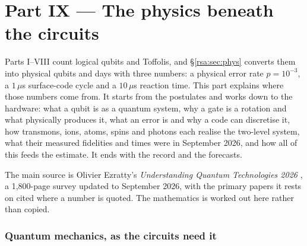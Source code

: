
\part*{Part IX --- The physics beneath the circuits}

\begin{keybox}[title={What this part is for}]
Parts I--VIII count logical qubits and Toffolis, and \S\ref{rsa:sec:phys} converts them into
physical qubits and days with three numbers: a physical error rate $p=10^{-3}$, a $1\,\mu$s
surface-code cycle and a $10\,\mu$s reaction time. This part explains where those numbers come
from. It starts from the postulates and works down to the hardware: what a qubit is as a quantum
system, why a gate is a rotation and what physically produces it, what an error is and why a code
can discretise it, how transmons, ions, atoms, spins and photons each realise the two-level
system, what their measured fidelities and times were in September 2026, and how all of this feeds
the estimate. It ends with the record and the forecasts.

\medskip
The main source is Olivier Ezratty's \emph{Understanding Quantum Technologies 2026}
\cite{ph:uqt26}, a 1,800-page survey updated to September 2026, with the primary papers it rests
on cited where a number is quoted. The mathematics is worked out here rather than copied.
\end{keybox}

\section{Quantum mechanics, as the circuits need it}\label{ph:sec:qm}

